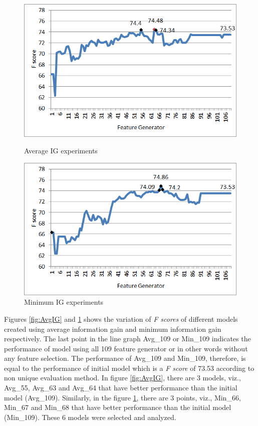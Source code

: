 \begin{figure}
\centering
\begin{minipage}{.5\textwidth}
  \centering
  \includegraphics[width=.95\textwidth]{figures/AvgIGAnalysis.png}
  \caption{Average IG experiments}
  \label{fig:AvgIG}
\end{minipage}%
\begin{minipage}{.5\textwidth}
  \centering
  \includegraphics[width=.95\textwidth]{figures/MinIGAnalysis.png}
  \caption{Minimum IG experiments}
  \label{fig:MinIG}
\end{minipage}
\end{figure} 

Figures \ref{fig:AvgIG} and \ref{fig:MinIG} shows the variation of \textit{F scores} of different models created using average information gain and minimum information gain respectively. The last point in the line graph Avg\_109 or Min\_109 indicates the performance of model using all 109 feature generator or in other words without any feature selection. The performance of Avg\_109 and Min\_109, therefore, is equal to the performance of initial model which is a \textit{F score} of 73.53 according to non unique evaluation method. In figure \ref{fig:AvgIG}, there are 3 models, viz., Avg\_55, Avg\_63 and Avg\_64 that have better performance than the initial model (Avg\_109). Similarly, in the figure \ref{fig:MinIG}, there are 3 points, viz., Min\_66, Min\_67 and Min\_68 that have better performance than the initial model (Min\_109). These 6 models were selected and analyzed.

